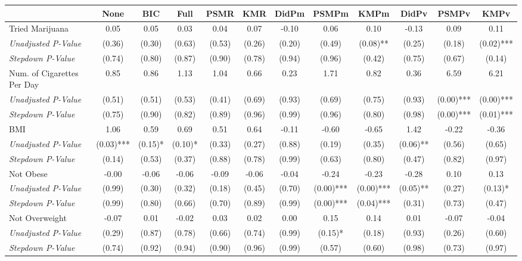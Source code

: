 \begin{tabular}{l c c c c c c c c c c c}
\toprule
 & None & BIC & Full & PSMR & KMR & DidPm & PSMPm & KMPm & DidPv & PSMPv & KMPv \\
\midrule
Tried Marijuana & 0.05 & 0.05 & 0.03 & 0.04 & 0.07 & -0.10 & 0.06 & 0.10 & -0.13 & 0.09 & 0.11 \\
\quad \textit{Unadjusted P-Value} & (0.36) & (0.30) & (0.63) & (0.53) & (0.26) & (0.20) & (0.49) & (0.08)** & (0.25) & (0.18) & (0.02)*** \\
\quad \textit{Stepdown P-Value} & (0.74) & (0.80) & (0.87) & (0.90) & (0.78) & (0.94) & (0.96) & (0.42) & (0.75) & (0.67) & (0.14) \\
Num. of Cigarettes Per Day & 0.85 & 0.86 & 1.13 & 1.04 & 0.66 & 0.23 & 1.71 & 0.82 & 0.36 & 6.59 & 6.21 \\
\quad \textit{Unadjusted P-Value} & (0.51) & (0.51) & (0.53) & (0.41) & (0.69) & (0.93) & (0.69) & (0.75) & (0.93) & (0.00)*** & (0.00)*** \\
\quad \textit{Stepdown P-Value} & (0.75) & (0.90) & (0.82) & (0.89) & (0.96) & (0.99) & (0.96) & (0.80) & (0.98) & (0.00)*** & (0.01)*** \\
BMI & 1.06 & 0.59 & 0.69 & 0.51 & 0.64 & -0.11 & -0.60 & -0.65 & 1.42 & -0.22 & -0.36 \\
\quad \textit{Unadjusted P-Value} & (0.03)*** & (0.15)* & (0.10)* & (0.33) & (0.27) & (0.88) & (0.19) & (0.35) & (0.06)** & (0.56) & (0.65) \\
\quad \textit{Stepdown P-Value} & (0.14) & (0.53) & (0.37) & (0.88) & (0.78) & (0.99) & (0.63) & (0.80) & (0.47) & (0.82) & (0.97) \\
Not Obese & -0.00 & -0.06 & -0.06 & -0.09 & -0.06 & -0.04 & -0.24 & -0.23 & -0.28 & 0.10 & 0.13 \\
\quad \textit{Unadjusted P-Value} & (0.99) & (0.30) & (0.32) & (0.18) & (0.45) & (0.70) & (0.00)*** & (0.00)*** & (0.05)** & (0.27) & (0.13)* \\
\quad \textit{Stepdown P-Value} & (0.99) & (0.80) & (0.66) & (0.70) & (0.89) & (0.99) & (0.00)*** & (0.04)*** & (0.31) & (0.73) & (0.47) \\
Not Overweight & -0.07 & 0.01 & -0.02 & 0.03 & 0.02 & 0.00 & 0.15 & 0.14 & 0.01 & -0.07 & -0.04 \\
\quad \textit{Unadjusted P-Value} & (0.29) & (0.87) & (0.78) & (0.66) & (0.74) & (0.99) & (0.15)* & (0.18) & (0.93) & (0.26) & (0.60) \\
\quad \textit{Stepdown P-Value} & (0.74) & (0.92) & (0.94) & (0.90) & (0.96) & (0.99) & (0.57) & (0.60) & (0.98) & (0.73) & (0.97) \\

\end{tabular}

